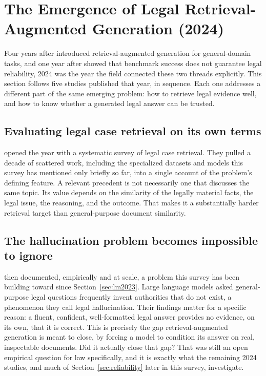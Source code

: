 \section{The Emergence of Legal Retrieval-Augmented Generation (2024)}
\label{sec:rag2024}

Four years after \citet{lewis2020} introduced retrieval-augmented generation for general-domain
tasks, and one year after \citet{guha2023} showed that benchmark success does not guarantee legal
reliability, 2024 was the year the field connected these two threads explicitly. This section
follows five studies published that year, in sequence. Each one addresses a different part of the
same emerging problem: how to retrieve legal evidence well, and how to know whether a generated
legal answer can be trusted.

\subsection{Evaluating legal case retrieval on its own terms}

\citet{feng2024} opened the year with a systematic survey of legal case retrieval. They pulled a
decade of scattered work, including the specialized datasets and models this survey has mentioned
only briefly so far, into a single account of the problem's defining feature. A relevant precedent
is not necessarily one that discusses the same topic. Its value depends on the similarity of the
legally material facts, the legal issue, the reasoning, and the outcome. That makes it a
substantially harder retrieval target than general-purpose document similarity.

\subsection{The hallucination problem becomes impossible to ignore}

\citet{dahl2024} then documented, empirically and at scale, a problem this survey has been building
toward since Section~\ref{sec:lm2023}. Large language models asked general-purpose legal questions
frequently invent authorities that do not exist, a phenomenon they call legal hallucination. Their
findings matter for a specific reason: a fluent, confident, well-formatted legal answer provides no
evidence, on its own, that it is correct. This is precisely the gap retrieval-augmented generation
is meant to close, by forcing a model to condition its answer on real, inspectable documents. Did it
actually close that gap? That was still an open empirical question for law specifically, and it is
exactly what the remaining 2024 studies, and much of Section~\ref{sec:reliability} later in this
survey, investigate.


